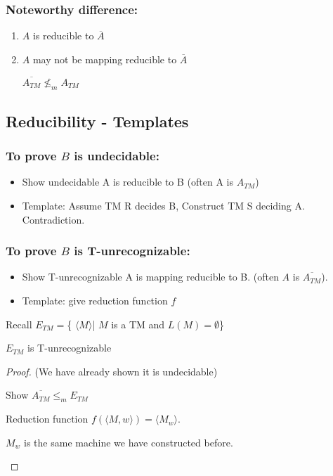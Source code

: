 \subsubsection{Noteworthy difference:} 
\begin{enumerate}
    \item \(A\) is reducible to \(\overline{A}\)  
    \item \(A\) may not be mapping reducible to \(\overline{A}\)  
    \begin{example}
        \(
        \overline{A_{TM}} \not\leq_m A_{TM}
        \) 
    \end{example}
\end{enumerate}


\subsection{Reducibility - Templates}

\subsubsection{To prove \(B\) is undecidable:} 
\begin{itemize}
    \item Show undecidable A is reducible to B (often A is \(A_{TM}\)) 
    \item Template: Assume TM R decides B, Construct TM S deciding A. Contradiction.
\end{itemize}

\subsubsection{To prove \(B\) is T-unrecognizable:} 
\begin{itemize}
    \item Show T-unrecognizable A is mapping reducible to B. (often \(A\) is \(\overline{A_{TM}}\)).
    \item Template: give reduction function \(f\) 
\end{itemize}

\begin{theorem}
    Recall \(E_{TM} = \)\{ \(\langle M \rangle\)| \(M\) is a TM and \(L(M) = \emptyset\)\} 

    \(E_{TM}\) is T-unrecognizable 
\end{theorem}
\begin{proof}
    (We have already shown it is undecidable)    

    Show \(\overline{A_{TM}} \leq_m E_{TM}\) 
    
    Reduction function \(f(\langle M, w \rangle) = \langle M_w \rangle\).
    \begin{remark}
        \(M_w\) is the same machine we have constructed before.
    \end{remark}
\end{proof}


